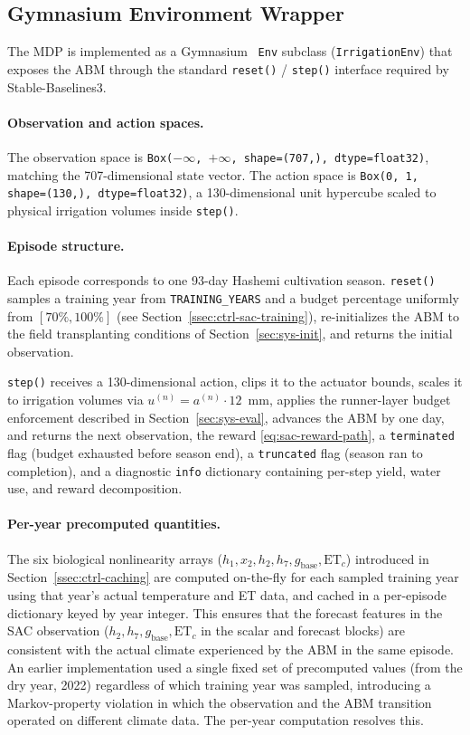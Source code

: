 \subsection{Gymnasium Environment Wrapper}
\label{ssec:ctrl-sac-gym}

The MDP is implemented as a Gymnasium~\cite{towers2024gymnasium}
\texttt{Env} subclass (\texttt{IrrigationEnv}) that exposes the ABM
through the standard \texttt{reset()} / \texttt{step()} interface required
by Stable-Baselines3.

\paragraph{Observation and action spaces.}
The observation space is \texttt{Box($-\infty$, $+\infty$,
shape=(707,), dtype=float32)}, matching the 707-dimensional state vector.
The action space is \texttt{Box(0, 1, shape=(130,), dtype=float32)}, a
130-dimensional unit hypercube scaled to physical irrigation volumes inside
\texttt{step()}.

\paragraph{Episode structure.}
Each episode corresponds to one 93-day Hashemi cultivation season.
\texttt{reset()} samples a training year from \texttt{TRAINING\_YEARS} and a
budget percentage uniformly from $[70\%, 100\%]$ (see
Section~\ref{ssec:ctrl-sac-training}), re-initializes the ABM to the field
transplanting conditions of Section~\ref{sec:sys-init}, and returns the
initial observation.

\texttt{step()} receives a 130-dimensional action, clips it to the
actuator bounds, scales it to irrigation volumes via $u^{(n)} = a^{(n)}
\cdot 12$~mm, applies the runner-layer budget enforcement described in
Section~\ref{sec:sys-eval}, advances the ABM by one day, and returns the
next observation, the reward \eqref{eq:sac-reward-path}, a
\texttt{terminated} flag (budget exhausted before season end), a
\texttt{truncated} flag (season ran to completion), and a diagnostic
\texttt{info} dictionary containing per-step yield, water use, and reward
decomposition.

\paragraph{Per-year precomputed quantities.}
The six biological nonlinearity arrays ($h_1, x_2, h_2, h_7, g_{\mathrm{base}},
\mathrm{ET}_c$) introduced in Section~\ref{ssec:ctrl-caching} are computed
on-the-fly for each sampled training year using that year's actual temperature
and ET data, and cached in a per-episode dictionary keyed by year integer.
This ensures that the forecast features in the SAC observation ($h_2, h_7,
g_{\mathrm{base}}, \mathrm{ET}_c$ in the scalar and forecast blocks) are
consistent with the actual climate experienced by the ABM in the same
episode. An earlier implementation used a single fixed set of precomputed
values (from the dry year, 2022) regardless of which training year was
sampled, introducing a Markov-property violation in which the observation
and the ABM transition operated on different climate data. The
per-year computation resolves this.

